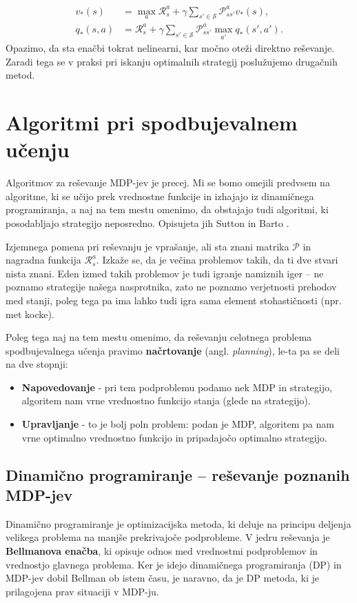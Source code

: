 \documentclass[12pt,a4paper]{amsart}
\theoremstyle{definition} %
\theoremstyle{plain} %
\begin{document}
\begin{align*}
    v_*(s) &= \max_a \mathcal{R}_s^a + \gamma \sum_{s' \in \mathcal{S}} \mathcal{P}_{ss'}^a v_*(s), \\
    q_*(s, a) &= \mathcal{R}_s^a + 
                \gamma \sum_{s' \in \mathcal{S}} \mathcal{P}_{ss'}^a \max_{a'} q_*(s', a').
\end{align*}
Opazimo, da sta enačbi tokrat nelinearni, kar močno oteži direktno reševanje. Zaradi tega se v praksi 
pri iskanju optimalnih strategij poslužujemo drugačnih metod.

\section{Algoritmi pri spodbujevalnem učenju}\label{algo}
\label{algoritmi}
Algoritmov za reševanje MDP-jev je precej. Mi se bomo omejili predvsem na algoritme, ki se učijo 
prek vrednostne funkcije in izhajajo iz dinamičnega programiranja, a naj na tem mestu omenimo, 
da obstajajo tudi algoritmi, ki posodabljajo strategijo neposredno. Opisujeta jih Sutton in Barto 
\cite{RLintro}.

Izjemnega pomena pri reševanju je vprašanje, ali sta znani matrika $\mathcal{P}$ in nagradna funkcija 
$\mathcal{R}_s^a$. Izkaže se, da je večina problemov takih, da ti dve stvari nista znani. Eden izmed 
takih problemov je tudi igranje namiznih iger -- ne poznamo strategije našega nasprotnika, zato ne 
poznamo verjetnosti prehodov med stanji, poleg tega pa ima lahko tudi igra sama element stohastičnosti 
(npr. met kocke).

Poleg tega naj na tem mestu omenimo, da reševanju celotnega problema spodbujevalnega učenja 
pravimo \textbf{načrtovanje} (angl. \textit{planning}), le-ta pa se deli na dve stopnji: 

\begin{itemize}
    \item \textbf{Napovedovanje} - pri tem podproblemu podamo nek MDP in strategijo, algoritem nam 
            vrne vrednostno funkcijo stanja (glede na strategijo).   
    \item \textbf{Upravljanje} - to je bolj poln problem: podan je MDP, algoritem pa nam vrne 
            optimalno vrednostno funkcijo in pripadajočo optimalno strategijo.
\end{itemize}

\subsection{Dinamično programiranje -- reševanje poznanih MDP-jev}
Dinamično programiranje je optimizacijska metoda, ki deluje na principu deljenja velikega problema 
na manjše prekrivajoče podprobleme. V jedru reševanja je \textbf{Bellmanova enačba}, ki opisuje 
odnos med vrednostmi podproblemov in vrednostjo glavnega problema. Ker je idejo dinamičnega 
programiranja (DP) in MDP-jev dobil Bellman ob istem času, je naravno, da je DP metoda, ki je 
prilagojena prav situaciji v MDP-ju.
\end{document}
